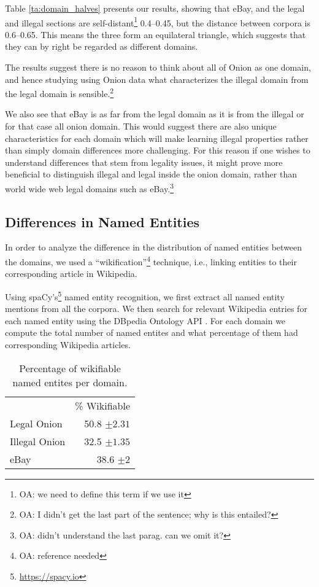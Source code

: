 \documentclass[11pt,a4paper,table]{article}
\newcommand{\oa}[1]{\footnote{\color{red}OA: #1}}
\begin{document}
    Table \ref{ta:domain_halves} presents our results, showing that eBay, and the legal and illegal sections are self-distant\oa{we need to define this term if we use it} 0.4--0.45, but the distance between corpora is 0.6--0.65. This means the three form an equilateral triangle, which suggests that they can by right be regarded as different domains. 
    
    The results suggest there is no reason to think about all of Onion as one domain, and hence studying using Onion data what characterizes the illegal domain from the legal domain is sensible.\oa{I didn't get the last part of the sentence; why is this entailed?}

    We also see that eBay is as far from the legal domain as it is from the illegal or for that case all onion domain. This would suggest there are also unique characteristics for each domain which will make learning illegal properties rather than simply domain differences more challenging. For this reason if one wishes to understand differences that stem from legality issues, it might prove more beneficial to distinguish illegal and legal inside the onion domain, rather than world wide web legal domains such as eBay.\oa{didn't understand the last parag. can we omit it?}

\subsection{Differences in Named Entities}

    In order to analyze the difference in the distribution of 
    named entities between the domains,  we used a ``wikification''\oa{reference needed} technique, i.e., linking entities to their corresponding article in Wikipedia.

    Using spaCy's\footnote{\url{https://spacy.io}}
    named entity recognition, we first extract all named
    entity mentions from all the corpora. 
    We then search for relevant Wikipedia entries for each named entity using the DBpedia Ontology API \cite{isem2013daiber}.
    For each domain we compute the total number of named entites and what percentage of them had corresponding Wikipedia articles.

\begin{table}
\begin{center}
\begin{tabular}{lr}
 & \% Wikifiable\\
Legal Onion & 50.8 $\pm2.31$\\
Illegal Onion & 32.5 $\pm1.35$\\
eBay & 38.6 $\pm2$\\
\end{tabular}
\end{center}
\caption{Percentage of wikifiable named entites per domain.\label{ta:wiki}}
\end{table}
\end{document}
